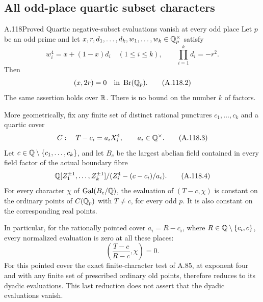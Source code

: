 \subsection{All odd-place quartic subset characters}

\begin{statement}{A.118}{Proved}
{Quartic negative-subset evaluations vanish at every odd place}
Let $p$ be an odd prime and let
$x,r,d_1,\ldots,d_k,w_1,\ldots,w_k\in\mathbb Q_p^\times$ satisfy
\[
 w_i^4=x+(1-x)d_i\quad(1\le i\le k),
       \qquad \prod_{i=1}^k d_i=-r^2.
\tag{A.118.1}
\]
Then
\[
                         (x,2r)=0
                              \quad\hbox{in }\operatorname{Br}(\mathbb Q_p).
\tag{A.118.2}
\]
The same assertion holds over $\mathbb R$.
There is no bound on the number $k$ of factors.

More geometrically, fix any finite set of distinct rational
punctures $c_1,\ldots,c_k$ and a quartic cover
\[
       C:\quad T-c_i=a_iX_i^4,\qquad a_i\in\mathbb Q^\times.
\tag{A.118.3}
\]
Let $c\in\mathbb Q\setminus\{c_1,\ldots,c_k\}$, and let $B_c$ be
the largest abelian field contained in every field factor of
the actual boundary fibre
\[
       \mathbb Q[Z_1^{\pm1},\ldots,Z_k^{\pm1}]
             /(Z_i^4-(c-c_i)/a_i).
\tag{A.118.4}
\]
For every character $\chi$ of $\operatorname{Gal}(B_c/\mathbb Q)$,
the evaluation of $(T-c,\chi)$ is constant on the ordinary
points of $C(\mathbb Q_p)$ with $T\ne c$, for every odd $p$.
It is also constant on the corresponding real points.

In particular, for the rationally pointed cover
$a_i=R-c_i$, where $R\in\mathbb Q\setminus\{c_i,c\}$, every
normalized evaluation is zero at all these places:
\[
              \left(\frac{T-c}{R-c},\chi\right)=0.
\tag{A.118.5}
\]
For this pointed cover the exact finite-character test of
A.85, at exponent four and with any finite set of prescribed
ordinary old points, therefore reduces to its dyadic
evaluations.  This last reduction does not assert that the
dyadic evaluations vanish.
\end{statement}
